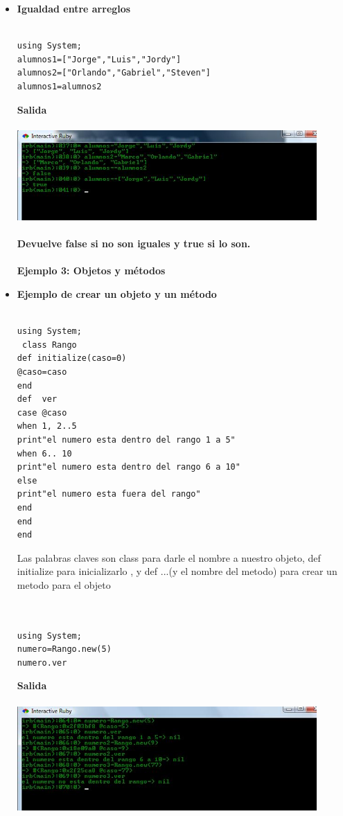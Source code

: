 \documentclass[11pt]{article} %
\begin{document}
\begin{itemize}
    \item {\bf Igualdad entre arreglos}\\\\
\begin{lstlisting}[frame=single]  % Start your code-block
using System;
alumnos1=["Jorge","Luis","Jordy"]
alumnos2=["Orlando","Gabriel","Steven"]
alumnos1=alumnos2
\end{lstlisting}
\bf Salida\\\\
	    \includegraphics[width=0.9\textwidth]{./imagenes/igualdad_entre_arreglos}\\\\
Devuelve false si no son iguales y true si lo son.\\\\

 {\fontsize{14}{0} \bf Ejemplo 3: Objetos y métodos\\}
  \item {\bf Ejemplo de crear un objeto y un método}\\\\
\begin{lstlisting}[frame=single]  % Start your code-block
using System;
 class Rango
def initialize(caso=0)
@caso=caso
end
def  ver
case @caso
when 1, 2..5
print"el numero esta dentro del rango 1 a 5"
when 6.. 10
print"el numero esta dentro del rango 6 a 10"
else
print"el numero esta fuera del rango"
end
end
end
\end{lstlisting}

	    
Las palabras claves son class para darle el nombre a nuestro objeto,  def  initialize  para inicializarlo , y def ...(y el nombre del metodo) para crear un metodo para el objeto\\\\

  	   \\
\begin{lstlisting}[frame=single]  % Start your code-block
using System;
numero=Rango.new(5)
numero.ver

\end{lstlisting}
\bf Salida\\\\
	    \includegraphics[width=0.9\textwidth]{./imagenes/uso_objecto}\\\\


\end{itemize}
\end{document}
